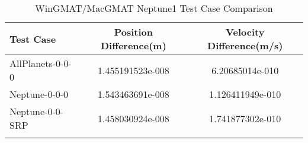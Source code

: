 \begin{table}[htbp!]
\centering
\caption{ WinGMAT/MacGMAT Neptune1 Test Case Comparison}
      \begin{tabular}{lcc}
      \hline\hline
          Test Case & Position Difference(m) & Velocity Difference(m/s) \\
         \hline
         AllPlanets-0-0-0 & 1.455191523e-008 & 6.20685014e-010 \\
         Neptune-0-0-0 & 1.543463691e-008 & 1.126411949e-010 \\
         Neptune-0-0-SRP & 1.458030924e-008 & 1.741877302e-010 \\
      \hline\hline
      \label{Table: Neptune1 WinGMAT-MacGMAT Table} 
\end{tabular}
\end{table}
